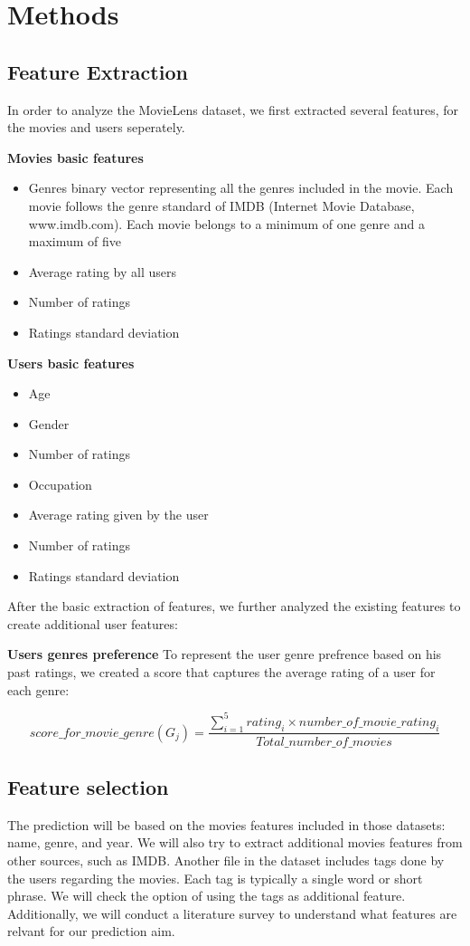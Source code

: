 \section{Methods}
\label{sec:methods}


\subsection{Feature Extraction}
In order to analyze the MovieLens dataset, we first extracted several features, for the movies and users seperately. 

\textbf{Movies basic features} 
\begin{itemize}
\item Genres binary vector representing all the genres included in the movie. Each movie follows the genre standard of IMDB (Internet Movie Database, www.imdb.com). Each movie belongs to a minimum of one genre and a maximum of five
\item Average rating by all users
\item Number of ratings
\item Ratings standard deviation
\end{itemize}

\textbf{Users basic features} 
\begin{itemize}
\item Age
\item Gender
\item Number of ratings
\item Occupation
\item Average rating given by the user
\item Number of ratings
\item Ratings standard deviation
\end{itemize}

After the basic extraction of features, we further analyzed the existing features to create additional user features:

\textbf{Users genres preference}
To represent the user genre prefrence based on his past ratings, we created a score that captures the average rating of a user for each genre: 

\begin{equation} score\_for\_movie\_genre(G_j) = \frac{\sum^5_{i=1}{rating_i\times number\_of\_movie\_rating_i}}{Total\_number\_of\_movies} 
\end{equation}

\subsection{Feature selection}
The prediction will be based on the movies features included in those datasets: name, genre, and year. We will also try to extract additional movies features from other sources, such as IMDB. Another file in the dataset includes tags done by the users regarding the movies. Each tag is typically a single word or short phrase. We will check the option of using the tags as additional feature.
Additionally, we will conduct a literature survey to understand what features are relvant for our prediction aim.

